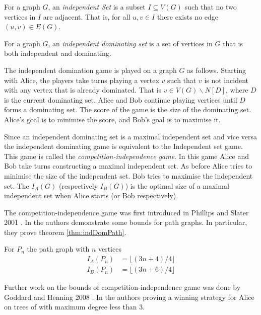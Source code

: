 \begin{definition}
    For a graph $G$, an \textit{independent Set} is a subset $I\subseteq V(G)$ such that no two vertices in $I$ are adjacent. That is, for all $u,v\in I$ there exists no edge $(u,v)\in E(G)$.
\end{definition}

\begin{definition}
   For a graph $G$, an \textit{independent dominating set} is a set of vertices in $G$ that is both independent and dominating.
\end{definition}

The independent domination game is played on a graph $G$ as follows. Starting with Alice, the players take turns playing a vertex $v$ such that $v$ is not incident with any vertex that is already dominated. That is $v\in V(G)\backslash N[D]$, where $D$ is the current dominating set. Alice and Bob continue playing vertices until $D$ forms a dominating set. The score of the game is the size of the dominating set. Alice's goal is to minimise the score, and Bob's goal is to maximise it.


Since an independent dominating set is a maximal independent set and vice versa the independent dominating game is equivalent to the Independent set game. This game is called the \textit{competition-independence game}. In this game Alice and Bob take turns constructing a maximal independent set. As before Alice tries to minimise the size of the independent set. Bob tries to maximise the independent set. The  $I_A(G)$ (respectively $I_B(G)$) is the optimal size of a maximal independent set when Alice starts (or Bob respectively). 

The competition-independence game was first introduced in Phillips and Slater 2001 \cite{PhillpsSlater2001}. In \cite{PhillpsSlater2001} the authors demonstrate some bounds for path graphs. In particular, they prove theorem \ref{thm:indDomPath}.
\begin{theorem}\label{thm:indDomPath}
    For $P_n$ the path graph with $n$ vertices
    \begin{align*}
    I_A(P_n) &=\lfloor(3n+4)/4\rfloor\\
    I_B(P_n) &=\lfloor(3n+6)/4\rfloor       
    \end{align*} 
\end{theorem}
Further work on the bounds of competition-independence game was done by Goddard and Henning 2008 \cite{GoddardHenning2018}. In \cite{GoddardHenning2018} the authors proving a winning strategy for Alice on trees of with maximum degree less than 3.

